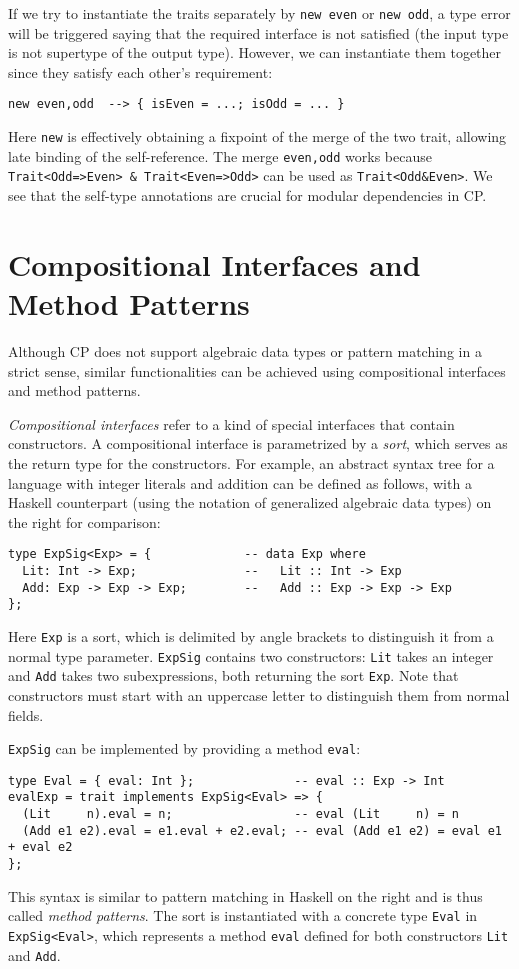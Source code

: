 \noindent
If we try to instantiate the traits separately by \lstinline{new even} or
\lstinline{new odd}, a type error will be triggered saying that the required
interface is not satisfied (the input type is not supertype of the output type).
However, we can instantiate them together since they satisfy each other's
requirement:
\begin{lstlisting}
new even,odd  --> { isEven = ...; isOdd = ... }
\end{lstlisting}
Here \lstinline{new} is effectively obtaining a fixpoint of the merge of the two
trait, allowing late binding of the self-reference. The merge
\lstinline{even,odd} works because \lstinline{Trait<Odd=>Even> & Trait<Even=>Odd>}
can be used as \lstinline{Trait<Odd&Even>}. We see that the self-type annotations
are crucial for modular dependencies in CP.

\section{Compositional Interfaces and Method Patterns}

Although CP does not support algebraic data types or pattern matching in a
strict sense, similar functionalities can be achieved using compositional
interfaces and method patterns.

\emph{Compositional interfaces} refer to a kind of special interfaces that
contain constructors. A compositional interface is parametrized by a
\emph{sort}, which serves as the return type for the constructors. For example,
an abstract syntax tree for a language with integer literals and addition can be
defined as follows, with a Haskell counterpart (using the notation of
generalized algebraic data types) on the right for comparison:
\begin{lstlisting}
type ExpSig<Exp> = {             -- data Exp where
  Lit: Int -> Exp;               --   Lit :: Int -> Exp
  Add: Exp -> Exp -> Exp;        --   Add :: Exp -> Exp -> Exp
};
\end{lstlisting}
Here \lstinline{Exp} is a sort, which is delimited by angle brackets to
distinguish it from a normal type parameter. \lstinline{ExpSig} contains two
constructors: \lstinline{Lit} takes an integer and \lstinline{Add} takes two
subexpressions, both returning the sort \lstinline{Exp}. Note that constructors
must start with an uppercase letter to distinguish them from normal fields.

\lstinline{ExpSig} can be implemented by providing a method \lstinline{eval}:
\begin{lstlisting}
type Eval = { eval: Int };              -- eval :: Exp -> Int
evalExp = trait implements ExpSig<Eval> => {
  (Lit     n).eval = n;                 -- eval (Lit     n) = n
  (Add e1 e2).eval = e1.eval + e2.eval; -- eval (Add e1 e2) = eval e1 + eval e2
};
\end{lstlisting}
This syntax is similar to pattern matching in Haskell on the right and is thus
called \emph{method patterns}. The sort is instantiated with a concrete type
\lstinline{Eval} in \lstinline{ExpSig<Eval>}, which represents a method
\lstinline{eval} defined for both constructors \lstinline{Lit} and
\lstinline{Add}.

